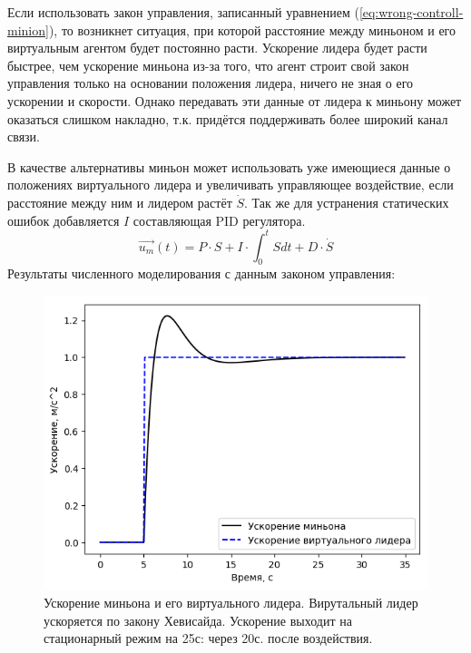 \documentclass[12pt,a4paper]{article}
\begin{document}
Если использовать закон управления, записанный уравнением (\ref{eq:wrong-controll-minion}), то возникнет ситуация, при которой расстояние между миньоном и его виртуальным агентом будет постоянно расти. Ускорение лидера будет расти быстрее, чем ускорение миньона из-за того, что агент строит свой закон управления только на основании положения лидера, ничего не зная о его ускорении и скорости. Однако передавать эти данные от лидера к миньону может оказаться слишком накладно, т.к. придётся поддерживать более широкий канал связи.
\par
В качестве альтернативы миньон может использовать уже имеющиеся данные о положениях виртуального лидера и увеличивать управляющее воздействие, если расстояние между ним и лидером растёт $\dot{S}$. Так же для устранения статических ошибок добавляется $I$ составляющая PID регулятора.
\begin{equation} \label{eq:right-controll-minion}
\vec{u_{m}}(t) = P \cdot S  + I \cdot \int_0^t{S}dt + D \cdot \dot{S}
\end{equation}
Результаты численного моделирования с данным законом управления:\par
\begin{figure}[!htbp]
	\centering
	\includegraphics[width=0.6\linewidth]{minion/heviside_accelerations}
	\caption{Ускорение миньона и его виртуального лидера. Вирутальный лидер ускоряется по закону Хевисайда. Ускорение выходит на стационарный режим на 25с: через 20с. после воздействия.}
	\label{fig:hevisideaccelerations}
\end{figure}
\end{document}
